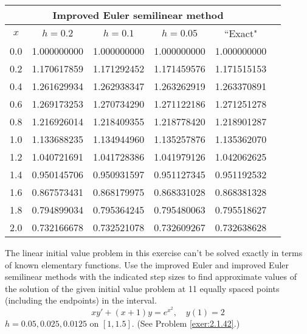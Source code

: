 \documentclass{ximera}
\begin{document}
\begin{problem}
\begin{solution}
{\small
\begin{tabular}{|c|r|r|r|r|r|}
\hline
\multicolumn{5}{|c|}{
Improved Euler semilinear method}\\\hline
\multicolumn{1}{|c|}{$x$}&
\multicolumn{1}{|c|}{$h=0.2$}&
\multicolumn{1}{|c|}{$h=0.1$}&
\multicolumn{1}{|c|}{$h=0.05$}&
\multicolumn{1}{|c|}{``Exact"}\\ \hline
0.0 & 1.000000000 & 1.000000000 & 1.000000000 & 1.000000000 \\
0.2 & 1.170617859 & 1.171292452 & 1.171459576 & 1.171515153 \\
0.4 & 1.261629934 & 1.262938347 & 1.263262919 & 1.263370891 \\
0.6 & 1.269173253 & 1.270734290 & 1.271122186 & 1.271251278 \\
0.8 & 1.216926014 & 1.218409355 & 1.218778420 & 1.218901287 \\
1.0 & 1.133688235 & 1.134944960 & 1.135257876 & 1.135362070 \\
1.2 & 1.040721691 & 1.041728386 & 1.041979126 & 1.042062625 \\
1.4 & 0.950145706 & 0.950931597 & 0.951127345 & 0.951192532 \\
1.6 & 0.867573431 & 0.868179975 & 0.868331028 & 0.868381328 \\
1.8 & 0.794899034 & 0.795364245 & 0.795480063 & 0.795518627 \\
2.0 & 0.732166678 & 0.732521078 & 0.732609267 & 0.732638628 \\
\hline
\end{tabular}}
 \end{solution}
 \end{problem}

\begin{problem}\label{exer:3.2.19} The linear initial value problem in this exercise can't be solved exactly in terms of known elementary functions. Use the improved Euler and improved Euler semilinear methods with the indicated step sizes to find approximate values of the solution of the given initial value problem at 11 equally spaced points (including the endpoints) in the interval.
$$xy'+(x+1)y=e^{x^2},\quad y(1)=2$$
$h=0.05,0.025,0.0125$ on $[1,1.5]$.
(See Problem \ref{exer:2.1.42}.)
\end{problem}
\end{document}
